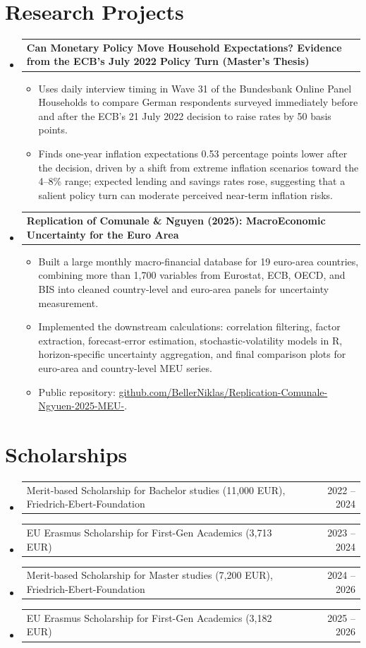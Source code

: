 \documentclass[a4paper,10pt]{article}
\makeatletter
\newcommand{\resumeItem}[1]{
  \item\small{{#1 \vspace{-2pt}}}
}
\newcommand{\resumeProjectHeading}[2]{
  \vspace{-2pt}\item
    \begin{tabularx}{0.97\textwidth}[t]{Xr}
      \textbf{#1} & #2 \\
    \end{tabularx}\vspace{-7pt}
}
\newcommand{\resumeCompactProjectHeading}[2]{
  \vspace{-5pt}\item
    {\small
    \begin{tabular*}{0.97\textwidth}[t]{l@{\extracolsep{\fill}}r}
      #1 & #2 \\
    \end{tabular*}}\vspace{-10pt}
}
\newcommand{\resumeSubHeadingListStart}{\begin{itemize}[leftmargin=0.15in, label={}]}
\newcommand{\resumeSubHeadingListEnd}{\end{itemize}}
\newcommand{\resumeItemListStart}{\begin{itemize}[leftmargin=0.2in, itemsep=1pt, parsep=0pt, topsep=2pt]}
\newcommand{\resumeItemListEnd}{\end{itemize}\vspace{-6pt}}
\makeatother
\begin{document}
\section{Research Projects}
  \resumeSubHeadingListStart
    \resumeProjectHeading
      {Can Monetary Policy Move Household Expectations? Evidence from the ECB's July 2022 Policy Turn (Master's Thesis)}{}
      \resumeItemListStart
        \resumeItem{Uses daily interview timing in Wave 31 of the Bundesbank Online Panel Households to compare German respondents surveyed immediately before and after the ECB's 21 July 2022 decision to raise rates by 50 basis points.}
        \resumeItem{Finds one-year inflation expectations 0.53 percentage points lower after the decision, driven by a shift from extreme inflation scenarios toward the 4--8\% range; expected lending and savings rates rose, suggesting that a salient policy turn can moderate perceived near-term inflation risks.}
      \resumeItemListEnd

    \resumeProjectHeading
      {Replication of Comunale \& Nguyen (2025): MacroEconomic Uncertainty for the Euro Area}{}
      \resumeItemListStart
        \resumeItem{Built a large monthly macro-financial database for 19 euro-area countries, combining more than 1,700 variables from Eurostat, ECB, OECD, and BIS into cleaned country-level and euro-area panels for uncertainty measurement.}
        \resumeItem{Implemented the downstream calculations: correlation filtering, factor extraction, forecast-error estimation, stochastic-volatility models in R, horizon-specific uncertainty aggregation, and final comparison plots for euro-area and country-level MEU series.}
        \resumeItem{Public repository: \href{https://github.com/BellerNiklas/Replication-Comunale-Ngyuen-2025-MEU-}{github.com/BellerNiklas/Replication-Comunale-Ngyuen-2025-MEU-}.}
      \resumeItemListEnd
  \resumeSubHeadingListEnd

\section{Scholarships}
  \vspace{5pt}
  \begin{itemize}[leftmargin=0.15in, label={}, itemsep=0pt, parsep=0pt, topsep=2pt]
    \resumeCompactProjectHeading
      {Merit-based Scholarship for Bachelor studies (11,000 EUR), Friedrich-Ebert-Foundation}{2022 -- 2024}
    \resumeCompactProjectHeading
      {EU Erasmus Scholarship for First-Gen Academics (3,713 EUR)}{2023 -- 2024}
    \resumeCompactProjectHeading
      {Merit-based Scholarship for Master studies (7,200 EUR), Friedrich-Ebert-Foundation}{2024 -- 2026}
    \resumeCompactProjectHeading
      {EU Erasmus Scholarship for First-Gen Academics (3,182 EUR)}{2025 -- 2026}
  \end{itemize}
\end{document}
